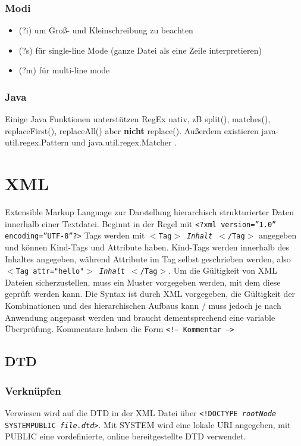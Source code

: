 \documentclass[12pt,a4]{article}
\begin{document}
\subsubsection{Modi}
\begin{itemize}
	\item (?i) um Groß- und Kleinschreibung zu beachten
	\item (?s) für single-line Mode (ganze Datei als eine Zeile interpretieren)
	\item (?m) für multi-line mode
\end{itemize}
\subsubsection{Java}
Einige Java Funktionen unterstützen RegEx nativ, zB split(), matches(), replaceFirst(), replaceAll() aber \textbf{nicht} replace(). Außerdem existieren java-util.regex.Pattern und java.util.regex.Matcher .

\section{XML}
Extensible Markup Language zur Darstellung hierarchisch strukturierter Daten innerhalb einer Textdatei. 
Beginnt in der Regel mit \texttt{<?xml version=''1.0'' encoding=''UTF-8''?>}
Tags werden mit \texttt{\(<\)Tag\(>\) \textit{Inhalt} \(<\)/Tag\(>\)} angegeben und können Kind-Tags und Attribute haben. Kind-Tags werden innerhalb des Inhaltes angegeben, während Attribute im Tag selbst geschrieben werden, also \newline \texttt{\(<\)Tag attr="hello"\(>\) \textit{Inhalt} \(<\)/Tag\(>\)}. Um die Gültigkeit von XML Dateien sicherzustellen, muss ein Muster vorgegeben werden, mit dem diese geprüft werden kann. Die Syntax ist durch XML vorgegeben, die Gültigkeit der Kombinationen und des hierarchischen Aufbaus kann / muss jedoch je nach Anwendung angepasst werden und braucht dementsprechend eine variable Überprüfung.
Kommentare haben die Form \texttt{<!-- Kommentar -->}
\subsection{DTD}
\subsubsection{Verknüpfen}
Verwiesen wird auf die DTD in der XML Datei über \texttt{<!DOCTYPE \textit{rootNode} SYSTEM\textbar PUBLIC \textit{file.dtd}>}. Mit SYSTEM wird eine lokale URI angegeben, mit PUBLIC eine vordefinierte, online bereitgestellte DTD verwendet.
\end{document}
